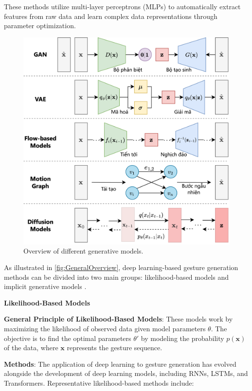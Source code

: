 These methods utilize multi-layer perceptrons (MLPs) to automatically extract features from raw data and learn complex data representations through parameter optimization.

\begin{figure}[h]
	\centering
	\includegraphics[width=\linewidth]{images/GeneralOverview}
	\caption{Overview of different generative models.}
	\label{fig:GeneralOverview}
\end{figure}

As illustrated in \autoref{fig:GeneralOverview}, deep learning-based gesture generation methods can be divided into two main groups: likelihood-based models and implicit generative models \cite{song2021score}.


\textbf{Likelihood-Based Models}


\textbf{General Principle of Likelihood-Based Models}: These models work by maximizing the likelihood of observed data given model parameters $\theta$. The objective is to find the optimal parameters $\theta'$ by modeling the probability $p(\mathbf{x})$ of the data, where $\mathbf{x}$ represents the gesture sequence.


\textbf{Methods}: The application of deep learning to gesture generation has evolved alongside the development of deep learning models, including RNNs, LSTMs, and Transformers. Representative likelihood-based methods include:

